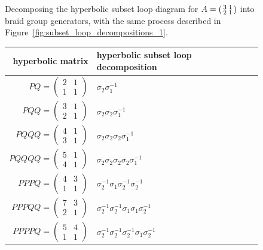 \documentclass[12pt,twoside]{reedthesis}
\theoremstyle{definition}
\begin{document}
\begin{figure}[p]
\begin{subfigure}[t]{0.24\linewidth}
  \end{subfigure}
  \caption{Decomposing the hyperbolic subset loop diagram for $A = \protect\begin{psmallmatrix}3 & 1 \\ 2 & 1\protect\end{psmallmatrix}$ into braid group generators, with the same process described in Figure~\ref{fig:subset_loop_decompositions_1}.}
  \label{fig:subset_loop_decompositions_2}
\end{figure}

\begin{figure}[p]
  \centering
  \begin{tabular}{r l}
   hyperbolic matrix & hyperbolic subset loop decomposition \\
   \toprule
   $PQ = \begin{pmatrix}2 & 1 \\ 1 & 1\end{pmatrix}$ & $\sigma_2 \sigma_1^{-1}$ \\[1em]
   $PQQ = \begin{pmatrix}3 & 1 \\ 2 & 1\end{pmatrix}$ & $\sigma_2 \sigma_2 \sigma_1^{-1}$ \\[1em]
   $PQQQ = \begin{pmatrix}4 & 1 \\ 3 & 1\end{pmatrix}$ & $\sigma_2 \sigma_2 \sigma_2 \sigma_1^{-1}$ \\[1em]
   $PQQQQ = \begin{pmatrix}5 & 1 \\ 4 & 1\end{pmatrix}$ & $\sigma_2 \sigma_2 \sigma_2 \sigma_2 \sigma_1^{-1}$ \\[1em]
   $PPPQ = \begin{pmatrix}4 & 3 \\ 1 & 1\end{pmatrix}$ & $\sigma_2^{-1} \sigma_1 \sigma_2^{-1} \sigma_2^{-1}$ \\[1em]
   $PPPQQ = \begin{pmatrix}7 & 3 \\ 2 & 1\end{pmatrix}$ & $\sigma_2^{-1} \sigma_2^{-1} \sigma_1 \sigma_1 \sigma_2^{-1}$ \\[1em]
   $PPPPQ = \begin{pmatrix}5 & 4 \\ 1 & 1\end{pmatrix}$ & $\sigma_2^{-1} \sigma_2^{-1} \sigma_2^{-1} \sigma_1 \sigma_2^{-1}$ \\[1em]

\end{tabular}
\end{figure}
\end{document}
